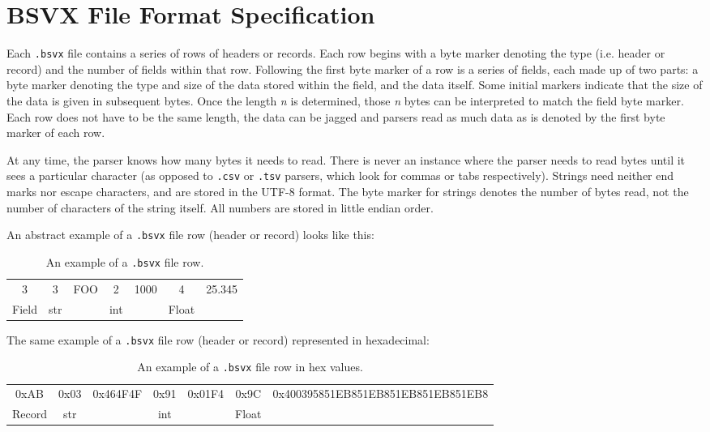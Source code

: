 \documentclass[10pt]{article}
\begin{document}
\section*{BSVX File Format Specification}

Each \texttt{.bsvx} file contains a series of rows of headers or records.
Each row begins with a byte marker denoting the type (i.e. header or record) and the number of fields within that row.
Following the first byte marker of a row is a series of fields, each made up of two parts: a byte marker denoting the type and size of the data stored within the field, and the data itself.
Some initial markers indicate that the size of the data is given in subsequent bytes.
Once the length \textit{n} is determined, those \textit{n} bytes can be interpreted to match the field byte marker.
Each row does not have to be the same length, the data can be jagged and parsers read as much data as is denoted by the first byte marker of each row. 

\indent{}
At any time, the parser knows how many bytes it needs to read.
There is never an instance where the parser needs to read bytes until it sees a particular character (as opposed to \texttt{.csv} or \texttt{.tsv} parsers, which look for commas or tabs respectively).
Strings need neither end marks nor escape characters, and are stored in the UTF-8 format.
The byte marker for strings denotes the number of bytes read, not the number of characters of the string itself.
All numbers are stored in little endian order.

\indent{}
An abstract example of a \texttt{.bsvx} file row (header or record) looks like this:

\begin{table}[H]
\centering
\begin{tabular}{|c|c|c|c|c|c|c|}
\hline
3 & 3 & FOO & 2 & 1000 & 4 & 25.345 \\
Field & str &  & int &  & Float &  \\ \hline
\end{tabular}
\caption{An example of a \texttt{.bsvx} file row.}
\label{tab:bsvxApproach_example}
\end{table}

\indent{}
The same example of a \texttt{.bsvx} file row (header or record) represented in hexadecimal:

\begin{table}[H]
\centering
\begin{tabular}{|c|c|c|c|c|c|c|}
\hline
0xAB & 0x03 & 0x464F4F & 0x91 & 0x01F4 & 0x9C & 0x400395851EB851EB851EB851EB851EB8 \\
Record & str &  & int &  & Float &  \\ \hline
\end{tabular}
\caption{An example of a \texttt{.bsvx} file row in hex values.}
\label{tab:bsvxApproach_example in hexadecimal}
\end{table}
\end{document}
